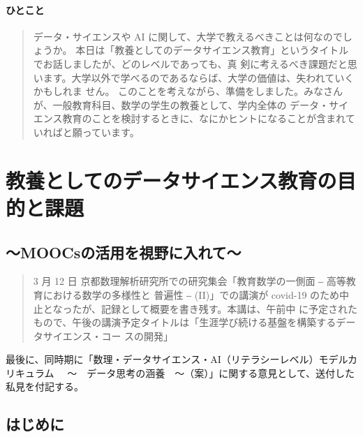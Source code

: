 \documentclass[
]{bxjsbook}
\theoremstyle{definition}
\theoremstyle{definition}
\theoremstyle{definition}
\theoremstyle{definition}
\theoremstyle{remark}
\begin{document}
\hypertarget{ux3072ux3068ux3053ux3068}{%
\paragraph{ひとこと}\label{ux3072ux3068ux3053ux3068}}

\begin{quote}
データ・サイエンスや AI に関して、大学で教えるべきことは何なのでしょうか。 本日は「教養としてのデータサイエンス教育」というタイトルでお話しましたが、どのレベルであっても、真
剣に考えるべき課題だと思います。大学以外で学べるのであるならば、大学の価値は、失われていくかもしれま
せん。
このことを考えながら、準備をしました。みなさんが、一般教育科目、数学の学生の教養として、学内全体の データ・サイエンス教育のことを検討するときに、なにかヒントになることが含まれていればと願っています。
\end{quote}

\hypertarget{math2020}{%
\section{教養としてのデータサイエンス教育の目的と課題}\label{math2020}}

\hypertarget{moocsux306eux6d3bux7528ux3092ux8996ux91ceux306bux5165ux308cux3066-1}{%
\subsection*{～MOOCsの活用を視野に入れて～}\label{moocsux306eux6d3bux7528ux3092ux8996ux91ceux306bux5165ux308cux3066-1}}

\begin{quote}
3 月 12 日 京都数理解析研究所での研究集会「教育数学の一側面 ‒ 高等教育における数学の多様性と 普遍性 ‒ (II)」での講演が covid-19 のため中止となったが、記録として概要を書き残す。本講は、午前中 に予定されたもので、午後の講演予定タイトルは「生涯学び続ける基盤を構築するデータサイエンス・コー スの開発」
\end{quote}

最後に、同時期に「数理・データサイエンス・AI（リテラシーレベル）モデルカリキュラム 　～　データ思考の涵養　～（案）」に関する意見として、送付した私見を付記する。

\hypertarget{ux306fux3058ux3081ux306b-5}{%
\subsection{はじめに}\label{ux306fux3058ux3081ux306b-5}}
\end{document}
